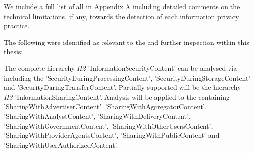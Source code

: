 We include a full list of all \ipp in Appendix A including detailed comments on the technical limitations, if any, towards the \sca detection of each information privacy practice.

The following \ipp were identified as relevant to the \sca and further inspection within this thesis:

The complete hierarchy \textit{H2} 'InformationSecurityContent' can be analysed via \sca including the \ipp 'SecurityDuringProcessingContent', 'SecurityDuringStorageContent' and 'SecurityDuringTransferContent'.
Partially supported will be the hierarchy \textit{H3} 'InformationSharingContent'. Analysis will be applied to the containing \ipp 'SharingWithAdvertiserContent', 'SharingWithAggregatorContent', 'SharingWithAnalystContent', 'SharingWithDeliveryContent', 'SharingWithGovernmentContent', 'SharingWithOtherUsersContent', 'SharingWithProviderAgentsContent', 'SharingWithPublicContent' and 'SharingWithUserAuthorizedContent'.
